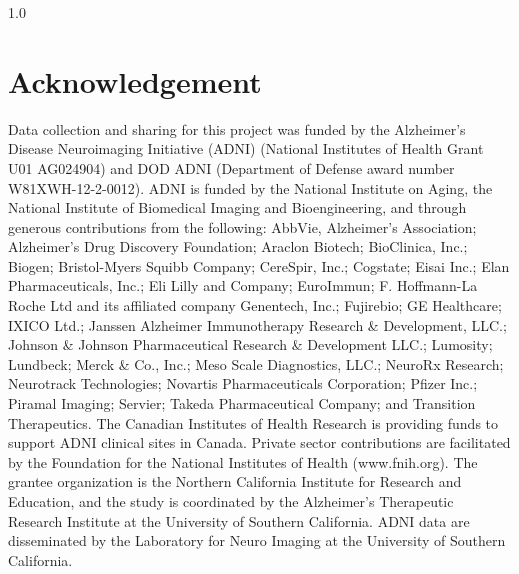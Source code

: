 \documentclass[12pt,twoside]{article}
\begin{document}
\begin{spacing}{1.0}
\section*{\fontsize{12}{12}\selectfont\textbf{Acknowledgement}}
{\footnotesize Data collection and sharing for this project was funded by the Alzheimer's
Disease Neuroimaging Initiative (ADNI) (National Institutes of Health Grant
U01 AG024904) and DOD ADNI (Department of Defense award number
W81XWH-12-2-0012). ADNI is funded by the National Institute on Aging, the
National Institute of Biomedical Imaging and Bioengineering, and through
generous contributions from the following: AbbVie, Alzheimer's Association;
Alzheimer's Drug Discovery Foundation; Araclon Biotech; BioClinica, Inc.;
Biogen; Bristol-Myers Squibb Company; CereSpir, Inc.; Cogstate; Eisai Inc.;
Elan Pharmaceuticals, Inc.; Eli Lilly and Company; EuroImmun; F.
Hoffmann-La Roche Ltd and its affiliated company Genentech, Inc.; Fujirebio;
GE Healthcare; IXICO Ltd.; Janssen Alzheimer Immunotherapy Research \&
Development, LLC.; Johnson \& Johnson Pharmaceutical Research \& Development
LLC.; Lumosity; Lundbeck; Merck \& Co., Inc.; Meso Scale Diagnostics, LLC.;
NeuroRx Research; Neurotrack Technologies; Novartis Pharmaceuticals
Corporation; Pfizer Inc.; Piramal Imaging; Servier; Takeda Pharmaceutical
Company; and Transition Therapeutics. The Canadian Institutes of Health
Research is providing funds to support ADNI clinical sites in Canada. Private
sector contributions are facilitated by the Foundation for the National
Institutes of Health (www.fnih.org). The grantee organization is the
Northern California Institute for Research and Education, and the study is
coordinated by the Alzheimer's Therapeutic Research Institute at the
University of Southern California. ADNI data are disseminated by the
Laboratory for Neuro Imaging at the University of Southern California.\par}


\end{spacing}
\end{document}
